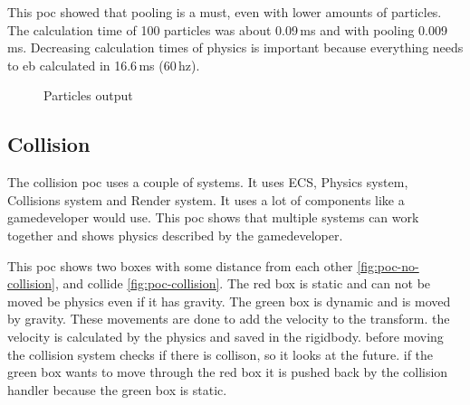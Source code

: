 \documentclass{projdoc}
\begin{document}
This \gls{poc} showed that pooling is a must, even with lower amounts of particles.
The calculation time of 100 particles was about 0.09\,ms and with pooling 0.009\,ms.
Decreasing calculation times of physics is important because everything needs to eb
calculated in 16.6\,ms (60\,hz).

\begin{figure}
	\centering
	\caption{Particles  output}
	\label{fig:poc-particles}
\end{figure}

\subsection{Collision}
\label{poc:collision}

The collision \gls{poc} \autocite[collision example]{crepe:code-repo} uses a couple
of systems. It uses ECS, Physics system, Collisions system and Render system. It uses
a lot of components like a gamedeveloper would use. This poc shows that multiple
systems can work together and shows physics described by the gamedeveloper.

This \gls{poc} shows two boxes with some distance from each other
\cref{fig:poc-no-collision}, and collide \cref{fig:poc-collision}. The red box is
static and can not be moved be physics even if it has gravity. The green box is
dynamic and is moved by gravity. These movements are done to add the velocity to the
transform. the velocity is calculated by the physics and saved in the rigidbody.
before moving the collision system checks if there is collison, so it looks at the
future. if the green box wants to move through the red box it is pushed back by the
collision handler because the green box is static.
\end{document}
